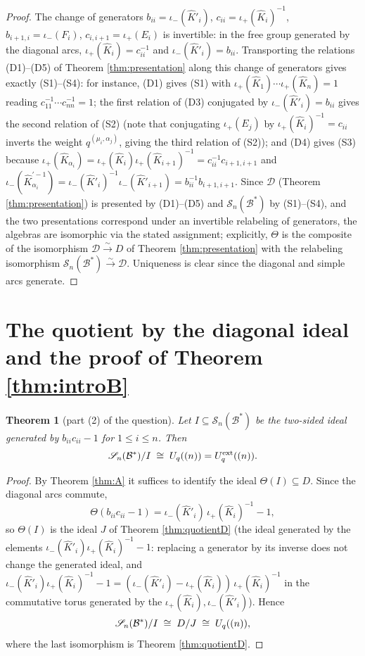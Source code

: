 \documentclass[11pt]{amsart}
\newtheorem{theorem}{Theorem}[section]
\theoremstyle{definition}
\newcommand{\SN}{\mathscr{S}_n(\mathcal{B}^*)}
\newcommand{\iop}{\iota_{+}}
\newcommand{\iom}{\iota_{-}}
\newcommand{\hK}{\hat K}
\newcommand{\al}{\alpha}
\begin{document}
\begin{proof}
The change of generators $b_{ii}=\iom(\hK'_i)$, $c_{ii}=\iop(\hK_i)^{-1}$,
$b_{i+1,i}=\iom(F_i)$, $c_{i,i+1}=\iop(E_i)$ is invertible: in the free group
generated by the diagonal arcs, $\iop(\hK_i)=c_{ii}^{-1}$ and
$\iom(\hK'_i)=b_{ii}$. Transporting the relations (D1)--(D5) of Theorem
\ref{thm:presentation} along this change of generators gives exactly
(S1)--(S4): for instance, (D1) gives (S1) with
$\iop(\hK_1)\cdots\iop(\hK_n)=1$ reading $c_{11}^{-1}\cdots c_{nn}^{-1}=1$;
the first relation of (D3) conjugated by $\iom(\hK'_i)=b_{ii}$ gives the second
relation of (S2) (note that conjugating $\iop(E_j)$ by $\iop(\hK_i)^{-1}=c_{ii}$
inverts the weight $q^{(\mu_i,\al_j)}$, giving the third relation of (S2));
and (D4) gives (S3) because
$\iop(\hK_{\al_i})=\iop(\hK_i)\iop(\hK_{i+1})^{-1}=c_{ii}^{-1}c_{i+1,i+1}$ and
$\iom(\hK_{\al_i}^{\prime-1})=\iom(\hK'_i)^{-1}\iom(\hK'_{i+1})
=b_{ii}^{-1}b_{i+1,i+1}$.
Since $\mathcal{D}$ (Theorem \ref{thm:presentation}) is presented by
(D1)--(D5) and $\SN$ by (S1)--(S4), and the two presentations correspond under
an invertible relabeling of generators, the algebras are isomorphic via the
stated assignment; explicitly, $\Theta$ is the composite of the isomorphism
$\mathcal{D}\xrightarrow{\sim}D$ of Theorem \ref{thm:presentation} with the
relabeling isomorphism $\SN\xrightarrow{\sim}\mathcal{D}$. Uniqueness is clear
since the diagonal and simple arcs generate.
\end{proof}

\section{The quotient by the diagonal ideal and the proof of Theorem
\ref{thm:introB}}\label{sec:quotient}

\begin{theorem}[part (2) of the question]\label{thm:B}
Let $I\subseteq\SN$ be the two-sided ideal generated by
$b_{ii}c_{ii}-1$ for $1\le i\le n$. Then
\[
\SN/I\;\cong\;U_q(\sl(n))=U_q^{\mathrm{ext}}(\sl(n)).
\]
\end{theorem}

\begin{proof}
By Theorem \ref{thm:A} it suffices to identify the ideal
$\Theta(I)\subseteq D$. Since the diagonal arcs commute,
\[
\Theta(b_{ii}c_{ii}-1)=\iom(\hK'_i)\,\iop(\hK_i)^{-1}-1 ,
\]
so $\Theta(I)$ is the ideal $J$ of Theorem \ref{thm:quotientD} (the ideal
generated by the elements $\iom(\hK'_i)\iop(\hK_i)^{-1}-1$: replacing a generator
by its inverse does not change the generated ideal, and
$\iom(\hK'_i)\iop(\hK_i)^{-1}-1=(\iom(\hK'_i)-\iop(\hK_i))\,\iop(\hK_i)^{-1}$ in
the commutative torus generated by the $\iop(\hK_i),\iom(\hK'_i)$). Hence
\[
\SN/I\;\cong\;D/J\;\cong\;U_q(\sl(n)),
\]
where the last isomorphism is Theorem \ref{thm:quotientD}.
\end{proof}
\end{document}
